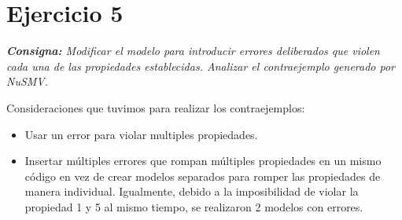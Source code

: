 \section*{Ejercicio 5}
\textit{\textbf{Consigna:} Modificar el modelo para introducir errores deliberados que violen cada una de las propiedades establecidas. Analizar el contraejemplo generado por NuSMV.}

Consideraciones que tuvimos para realizar los contraejemplos:

\begin{itemize}
    \item Usar un error para violar multiples propiedades.
    \item Insertar múltiples errores que rompan múltiples propiedades en un mismo código en vez de crear modelos separados para romper las propiedades de manera individual. Igualmente, debido a la imposibilidad de violar la propiedad 1 y 5 al mismo tiempo, se realizaron 2 modelos con errores.
\end{itemize}
